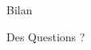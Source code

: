 \documentclass[12pt,handout]{beamer}
\begin{document}
\begin{frame}[plain,c]

\begin{center}
\Huge Bilan
\end{center}


\end{frame}

\begin{frame}[plain,c]

\begin{center}
\huge Des Questions ?
\end{center}


\end{frame}
\end{document}
